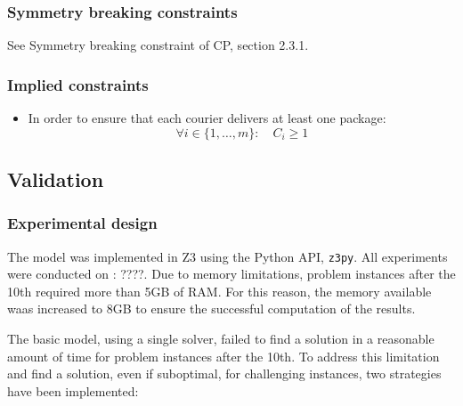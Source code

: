 \subsubsection{Symmetry breaking constraints}
See Symmetry breaking constraint of CP, section 2.3.1. 

\subsubsection{Implied constraints}

\begin{itemize}
    \item In order to ensure that each courier delivers at least one package:
    \begin{equation}
        \forall i \in \{1, \dots, m\}: \quad C_i \geq 1  
    \end{equation}
\end{itemize}


\subsection{Validation}

\subsubsection{Experimental design}
The model was implemented in Z3 using the Python API, \texttt{z3py}. All experiments were conducted on : ????. Due to memory limitations, problem instances after the 10th required more than 5GB of RAM. For this reason, the memory available waas increased to 8GB to ensure the successful computation of the results.

The basic model, using a single solver, failed to find a solution in a reasonable amount of time for problem instances after the 10th. To address this limitation and find a solution, even if suboptimal, for challenging instances, two strategies have been implemented:

